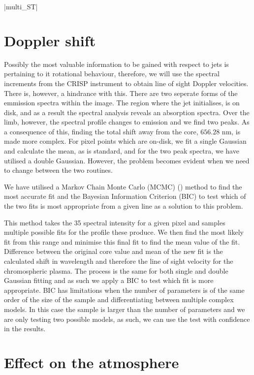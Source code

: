 \documentclass{emulateapj}
\begin{document}
\py[STEREO]|multi_ST|



\section{Doppler shift}
\label{dop_shift_sect}

Possibly the most valuable information to be gained with respect to jets is pertaining to it rotational behaviour, therefore, we will use the spectral increments from the CRISP instrument to obtain line of sight Doppler velocities.
There is, however, a hindrance with this.
There are two seperate forms of the emmission spectra within the image.
The region where the jet initialises, is on disk, and as a result the spectral analysis reveals an absorption spectra.
Over the limb, however, the spectral profile changes to emission and we find two peaks.
As a consequence of this, finding the total shift away from the core, $656.28$ nm, is made more complex.
For pixel points which are on-disk, we fit a single Gaussian and calculate the mean, as is standard, and for the two peak spectra, we have utilised a double Gaussian.
However, the problem becomes evident when we need to change between the two routines.

We have utilised a Markov Chain Monte Carlo (MCMC) (\cite{Richey2010}) method to find the most accurate fit and the Bayesian Information Criterion (BIC) to test which of the two fits is most appropriate from a given line as a solution to this problem.

This method takes the 35 spectral intensity for a given pixel and samples multiple possible fits for the profile these produce.
We then find the most likely fit from this range and minimise this final fit to find the mean value of the fit.
Difference between the original core value and mean of the new fit is the calculated shift in wavelength and therefore the line of sight velocity for the chromospheric plasma.
The process is the same for both single and double Gaussian fitting and as such we apply a BIC to test which fit is more appropriate.
BIC has limitations when the number of parameters is of the same order of the size of the sample and differentiating between multiple complex models.
In this case the sample is larger than the number of parameters and we are only testing two possible models, as such, we can use the test with confidence in the results.





\section{Effect on the atmosphere}
\label{temp_map_sect}
\end{document}
